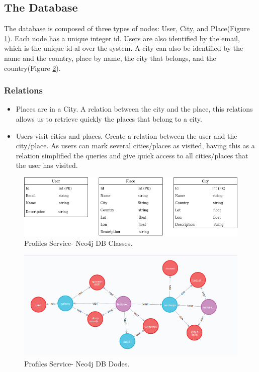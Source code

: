 \subsection{The Database}

\indent
\indent
The database is composed of three types of nodes: User, City, and Place(Figure \ref{profiles:dbuml}). Each node has a unique integer id. Users are also identified by the email, which is the unique id al over the system. A city can also be identified by the name and the country, place by name, the city that belongs, and the country(Figure \ref{profiles:dbnodes}).


\subsubsection{Relations}

\begin{itemize}
	\item  Places are in a City.  A relation between the city and the place, this relations allows us to retrieve quickly the places that belong to a city.
	
	\item Users visit cities and places. Create a relation between the user and the city/place. As users can mark several cities/places as visited, having this as a relation simplified the queries and give quick access to all cities/places that the user has visited.
\end{itemize}


\begin{figure}
	\begin{center}
		\includegraphics[width=120mm,scale=1]{img/profiles/profile-uml.png}
		\caption{Profiles Service- Neo4j DB Classes.}
		\label{profiles:dbuml}
	\end{center}
\end{figure}

\begin{figure}
	\begin{center}
		\includegraphics[width=120mm,scale=1]{img/profiles/neo4j-nodes.png}
		\caption{Profiles Service- Neo4j DB Dodes.}
		\label{profiles:dbnodes}
	\end{center}
\end{figure}
